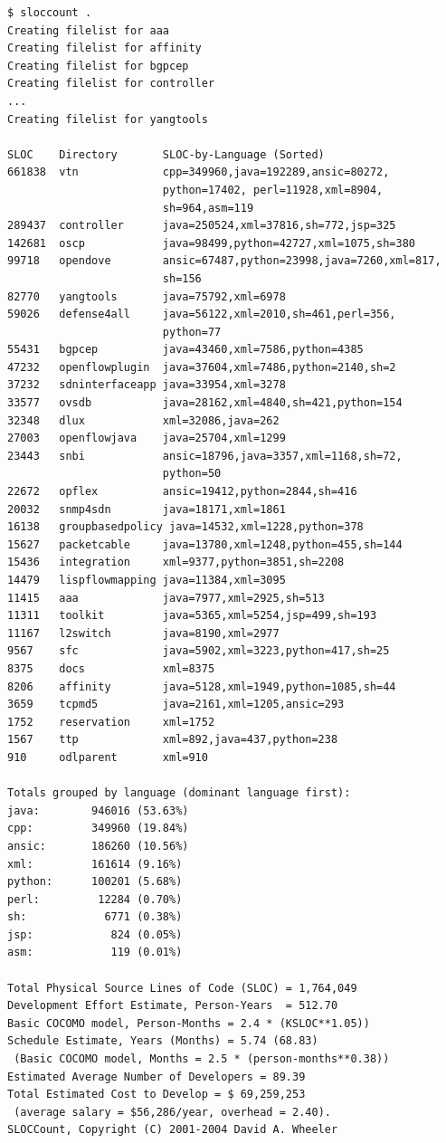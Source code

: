 \documentclass[a4paper, 12pt]{book}
\begin{document}
\begin{verbatim}
$ sloccount .
Creating filelist for aaa
Creating filelist for affinity
Creating filelist for bgpcep
Creating filelist for controller
...
Creating filelist for yangtools

SLOC    Directory       SLOC-by-Language (Sorted)
661838  vtn             cpp=349960,java=192289,ansic=80272,
                        python=17402, perl=11928,xml=8904,
                        sh=964,asm=119
289437  controller      java=250524,xml=37816,sh=772,jsp=325
142681  oscp            java=98499,python=42727,xml=1075,sh=380
99718   opendove        ansic=67487,python=23998,java=7260,xml=817,
                        sh=156
82770   yangtools       java=75792,xml=6978
59026   defense4all     java=56122,xml=2010,sh=461,perl=356,
                        python=77
55431   bgpcep          java=43460,xml=7586,python=4385
47232   openflowplugin  java=37604,xml=7486,python=2140,sh=2
37232   sdninterfaceapp java=33954,xml=3278
33577   ovsdb           java=28162,xml=4840,sh=421,python=154
32348   dlux            xml=32086,java=262
27003   openflowjava    java=25704,xml=1299
23443   snbi            ansic=18796,java=3357,xml=1168,sh=72,
                        python=50
22672   opflex          ansic=19412,python=2844,sh=416
20032   snmp4sdn        java=18171,xml=1861
16138   groupbasedpolicy java=14532,xml=1228,python=378
15627   packetcable     java=13780,xml=1248,python=455,sh=144
15436   integration     xml=9377,python=3851,sh=2208
14479   lispflowmapping java=11384,xml=3095
11415   aaa             java=7977,xml=2925,sh=513
11311   toolkit         java=5365,xml=5254,jsp=499,sh=193
11167   l2switch        java=8190,xml=2977
9567    sfc             java=5902,xml=3223,python=417,sh=25
8375    docs            xml=8375
8206    affinity        java=5128,xml=1949,python=1085,sh=44
3659    tcpmd5          java=2161,xml=1205,ansic=293
1752    reservation     xml=1752
1567    ttp             xml=892,java=437,python=238
910     odlparent       xml=910

Totals grouped by language (dominant language first):
java:        946016 (53.63%)
cpp:         349960 (19.84%)
ansic:       186260 (10.56%)
xml:         161614 (9.16%)
python:      100201 (5.68%)
perl:         12284 (0.70%)
sh:            6771 (0.38%)
jsp:            824 (0.05%)
asm:            119 (0.01%)

Total Physical Source Lines of Code (SLOC) = 1,764,049
Development Effort Estimate, Person-Years  = 512.70
Basic COCOMO model, Person-Months = 2.4 * (KSLOC**1.05))
Schedule Estimate, Years (Months) = 5.74 (68.83)
 (Basic COCOMO model, Months = 2.5 * (person-months**0.38))
Estimated Average Number of Developers = 89.39
Total Estimated Cost to Develop = $ 69,259,253
 (average salary = $56,286/year, overhead = 2.40).
SLOCCount, Copyright (C) 2001-2004 David A. Wheeler

\end{verbatim}
\end{document}
